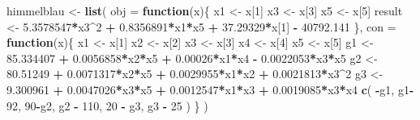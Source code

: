 \documentclass[]{ctexbook}
\newenvironment{Shaded}{\begin{snugshade}}{\end{snugshade}}
\newcommand{\KeywordTok}[1]{\textcolor[rgb]{0.13,0.29,0.53}{\textbf{#1}}}
\newcommand{\DataTypeTok}[1]{\textcolor[rgb]{0.13,0.29,0.53}{#1}}
\newcommand{\DecValTok}[1]{\textcolor[rgb]{0.00,0.00,0.81}{#1}}
\newcommand{\FloatTok}[1]{\textcolor[rgb]{0.00,0.00,0.81}{#1}}
\newcommand{\StringTok}[1]{\textcolor[rgb]{0.31,0.60,0.02}{#1}}
\newcommand{\ControlFlowTok}[1]{\textcolor[rgb]{0.13,0.29,0.53}{\textbf{#1}}}
\newcommand{\OperatorTok}[1]{\textcolor[rgb]{0.81,0.36,0.00}{\textbf{#1}}}
\newcommand{\NormalTok}[1]{#1}
\theoremstyle{definition}
\theoremstyle{definition}
\theoremstyle{definition}
\theoremstyle{remark}
\begin{document}
\begin{Shaded}
\begin{Highlighting}[]
\NormalTok{himmelblau <-}\StringTok{ }\KeywordTok{list}\NormalTok{(}
  \DataTypeTok{obj =} \ControlFlowTok{function}\NormalTok{(x)\{}
\NormalTok{    x1 <-}\StringTok{ }\NormalTok{x[}\DecValTok{1}\NormalTok{]}
\NormalTok{    x3 <-}\StringTok{ }\NormalTok{x[}\DecValTok{3}\NormalTok{]}
\NormalTok{    x5 <-}\StringTok{ }\NormalTok{x[}\DecValTok{5}\NormalTok{]}
\NormalTok{    result <-}\StringTok{ }\FloatTok{5.3578547}\OperatorTok{*}\NormalTok{x3}\OperatorTok{^}\DecValTok{2} \OperatorTok{+}\StringTok{ }
\StringTok{      }\FloatTok{0.8356891}\OperatorTok{*}\NormalTok{x1}\OperatorTok{*}\NormalTok{x5 }\OperatorTok{+}\StringTok{ }
\StringTok{      }\FloatTok{37.29329}\OperatorTok{*}\NormalTok{x[}\DecValTok{1}\NormalTok{] }\OperatorTok{-}\StringTok{ }
\StringTok{      }\FloatTok{40792.141}
\NormalTok{  \},}
  \DataTypeTok{con =} \ControlFlowTok{function}\NormalTok{(x)\{}
\NormalTok{    x1 <-}\StringTok{ }\NormalTok{x[}\DecValTok{1}\NormalTok{]}
\NormalTok{    x2 <-}\StringTok{ }\NormalTok{x[}\DecValTok{2}\NormalTok{]}
\NormalTok{    x3 <-}\StringTok{ }\NormalTok{x[}\DecValTok{3}\NormalTok{]}
\NormalTok{    x4 <-}\StringTok{ }\NormalTok{x[}\DecValTok{4}\NormalTok{]}
\NormalTok{    x5 <-}\StringTok{ }\NormalTok{x[}\DecValTok{5}\NormalTok{]}
\NormalTok{    g1 <-}\StringTok{ }\FloatTok{85.334407} \OperatorTok{+}\StringTok{ }\FloatTok{0.0056858}\OperatorTok{*}\NormalTok{x2}\OperatorTok{*}\NormalTok{x5 }\OperatorTok{+}\StringTok{ }
\StringTok{      }\FloatTok{0.00026}\OperatorTok{*}\NormalTok{x1}\OperatorTok{*}\NormalTok{x4 }\OperatorTok{-}\StringTok{ }\FloatTok{0.0022053}\OperatorTok{*}\NormalTok{x3}\OperatorTok{*}\NormalTok{x5}
\NormalTok{    g2 <-}\StringTok{ }\FloatTok{80.51249} \OperatorTok{+}\StringTok{ }\FloatTok{0.0071317}\OperatorTok{*}\NormalTok{x2}\OperatorTok{*}\NormalTok{x5 }\OperatorTok{+}\StringTok{ }
\StringTok{      }\FloatTok{0.0029955}\OperatorTok{*}\NormalTok{x1}\OperatorTok{*}\NormalTok{x2 }\OperatorTok{+}\StringTok{ }\FloatTok{0.0021813}\OperatorTok{*}\NormalTok{x3}\OperatorTok{^}\DecValTok{2}
\NormalTok{    g3 <-}\StringTok{ }\FloatTok{9.300961} \OperatorTok{+}\StringTok{ }\FloatTok{0.0047026}\OperatorTok{*}\NormalTok{x3}\OperatorTok{*}\NormalTok{x5 }\OperatorTok{+}\StringTok{ }
\StringTok{      }\FloatTok{0.0012547}\OperatorTok{*}\NormalTok{x1}\OperatorTok{*}\NormalTok{x3 }\OperatorTok{+}\StringTok{ }\FloatTok{0.0019085}\OperatorTok{*}\NormalTok{x3}\OperatorTok{*}\NormalTok{x4}
    \KeywordTok{c}\NormalTok{(}
      \OperatorTok{-}\NormalTok{g1,}
\NormalTok{      g1}\OperatorTok{-}\DecValTok{92}\NormalTok{,}
      \DecValTok{90}\OperatorTok{-}\NormalTok{g2,}
\NormalTok{      g2 }\OperatorTok{-}\StringTok{ }\DecValTok{110}\NormalTok{,}
      \DecValTok{20} \OperatorTok{-}\StringTok{ }\NormalTok{g3,}
\NormalTok{      g3 }\OperatorTok{-}\StringTok{ }\DecValTok{25}
\NormalTok{    )}
\NormalTok{  \}}
\NormalTok{)}
\end{Highlighting}
\end{Shaded}
\end{document}
